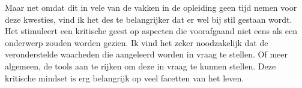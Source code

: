 \documentclass[]{article}
\begin{document}
Maar net omdat dit in vele van de vakken in de opleiding geen tijd nemen voor
deze kwesties, vind ik het des te belangrijker dat er wel bij stil gestaan
wordt. Het stimuleert een kritische geest op aspecten die voorafgaand niet eens
als een onderwerp zouden worden gezien. Ik vind het zeker noodzakelijk dat de
veronderstelde waarheden die aangeleerd worden in vraag te stellen. Of meer
algemeen, de tools aan te rijken om deze in vraag te kunnen stellen. Deze
kritische mindset is erg belangrijk op veel facetten van het leven.

\nocite{*} 

\end{document}
